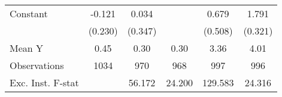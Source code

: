 {\begin{tabular}{l*{5}{c}}
\addlinespace
Constant            &      -0.121         &       0.034         &                     &       0.679         &       1.791\sym{***}\\
                    &     (0.230)         &     (0.347)         &                     &     (0.508)         &     (0.321)         \\
\midrule
Mean Y              &        0.45         &        0.30         &        0.30         &        3.36         &        4.01         \\
Observations        &        1034         &         970         &         968         &         997         &         996         \\
Exc. Inst. F-stat   &                     &      56.172         &      24.200         &     129.583         &      24.316         \\
\bottomrule
\end{tabular}
}

